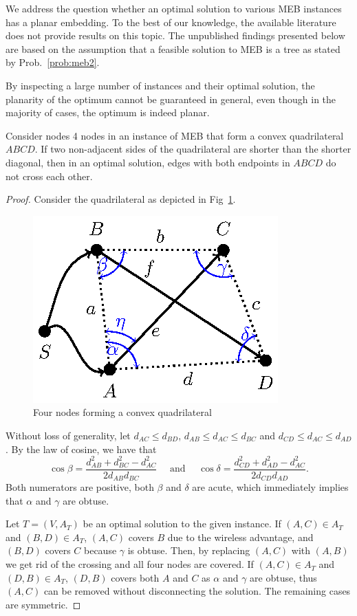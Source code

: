 We address the question whether an optimal solution to various MEB instances has a planar embedding.
To the best of our knowledge, the available literature does not provide results on this topic.
The unpublished findings presented below are based on the assumption that a feasible solution to MEB is a tree as stated by Prob.~\ref{prob:meb2}.

By inspecting a large number of instances and their optimal solution, the planarity of the optimum cannot be guaranteed in general, even though in the majority of cases, the optimum is indeed planar.
\begin{proposition}\label{prop:mebplan}
Consider nodes 4 nodes in an instance of MEB that form a convex quadrilateral $ABCD$.
If two non-adjacent sides of the quadrilateral are shorter than the shorter diagonal, then in an optimal solution, edges with both endpoints in $ABCD$ do not cross each other.
\end{proposition}
\begin{proof}
Consider the quadrilateral as depicted in Fig~\ref{fig:quad}. 
\begin{figure}[htb!]
  \centering
  \includegraphics[scale=1.4]{figurer/quadrilat.eps}
  \caption{Four nodes forming a convex quadrilateral}
  \label{fig:quad}
\end{figure}
Without loss of generality, let $d_{AC}\leq d_{BD}$, $d_{AB}\leq d_{AC}\leq d_{BC}$ and $d_{CD}\leq d_{AC}\leq d_{AD}$.
By the law of cosine, we have that 
$$
\cos{\beta}=\frac{d^2_{AB} + d^2_{BC} - d^2_{AC}}{2d_{AB}d_{BC}} \text{~~~ and ~~~}\cos{\delta}=\frac{d^2_{CD} + d^2_{AD} - d^2_{AC}}{2d_{CD}d_{AD}}.
$$
Both numerators are positive, both $\beta$ and $\delta$ are acute, which immediately implies that $\alpha $ and $\gamma$ are obtuse.

Let $T=(V,A_T)$ be an optimal solution to the given instance.
If $(A,C)\in A_T$ and $(B,D)\in A_T$, $(A,C)$ covers $B$ due to the wireless advantage, and $(B,D)$ covers $C$ because $\gamma$ is obtuse.
Then, by replacing $(A,C)$ with $(A,B)$ we get rid of the crossing and all four nodes are covered.
If $(A,C)\in A_T$ and $(D,B)\in A_T$, $(D,B)$ covers both $A$ and $C$ as $\alpha$ and $\gamma$ are obtuse, thus $(A,C)$ can be removed without disconnecting the solution.
The remaining cases are symmetric.
\end{proof}
